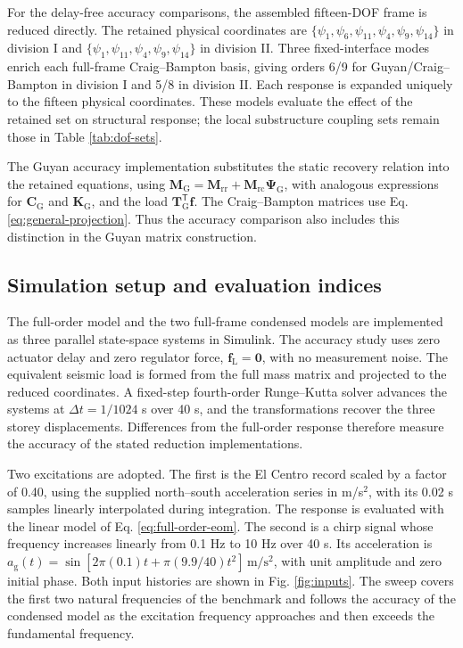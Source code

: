 \documentclass[a4paper,fleqn,review,12pt]{cas-sc}
\begin{document}
For the delay-free accuracy comparisons, the assembled fifteen-DOF frame is reduced directly. The retained physical coordinates are \(\{\psi_1,\psi_6,\psi_{11},\psi_4,\psi_9,\psi_{14}\}\) in division I and \(\{\psi_1,\psi_{11},\psi_4,\psi_9,\psi_{14}\}\) in division II. Three fixed-interface modes enrich each full-frame Craig--Bampton basis, giving orders 6/9 for Guyan/Craig--Bampton in division I and 5/8 in division II. Each response is expanded uniquely to the fifteen physical coordinates. These models evaluate the effect of the retained set on structural response; the local substructure coupling sets remain those in Table \ref{tab:dof-sets}.

The Guyan accuracy implementation substitutes the static recovery relation into the retained equations, using \(\mathbf M_{\mathrm G}=\mathbf M_{\mathrm{rr}}+\mathbf M_{\mathrm{rc}}\bm\Psi_{\mathrm G}\), with analogous expressions for \(\mathbf C_{\mathrm G}\) and \(\mathbf K_{\mathrm G}\), and the load \(\mathbf T_{\mathrm G}^{\mathsf T}\bm f\). The Craig--Bampton matrices use Eq. \eqref{eq:general-projection}. Thus the accuracy comparison also includes this distinction in the Guyan matrix construction.

\subsection{Simulation setup and evaluation indices}
\label{sec:setup}

The full-order model and the two full-frame condensed models are implemented as three parallel state-space systems in Simulink. The accuracy study uses zero actuator delay and zero regulator force, \(\bm f_{\mathrm L}=\bm0\), with no measurement noise. The equivalent seismic load is formed from the full mass matrix and projected to the reduced coordinates. A fixed-step fourth-order Runge--Kutta solver advances the systems at \(\Delta t=1/1024\) s over 40 s, and the transformations recover the three storey displacements. Differences from the full-order response therefore measure the accuracy of the stated reduction implementations.

Two excitations are adopted. The first is the El Centro record scaled by a factor of 0.40, using the supplied north--south acceleration series in m/s\(^{2}\), with its 0.02 s samples linearly interpolated during integration. The response is evaluated with the linear model of Eq. \eqref{eq:full-order-eom}. The second is a chirp signal whose frequency increases linearly from 0.1 Hz to 10 Hz over 40 s. Its acceleration is \(a_{\mathrm g}(t)=\sin[2\pi(0.1)t+\pi(9.9/40)t^2]\,\mathrm{m/s^2}\), with unit amplitude and zero initial phase. Both input histories are shown in Fig. \ref{fig:inputs}. The sweep covers the first two natural frequencies of the benchmark and follows the accuracy of the condensed model as the excitation frequency approaches and then exceeds the fundamental frequency.
\end{document}
